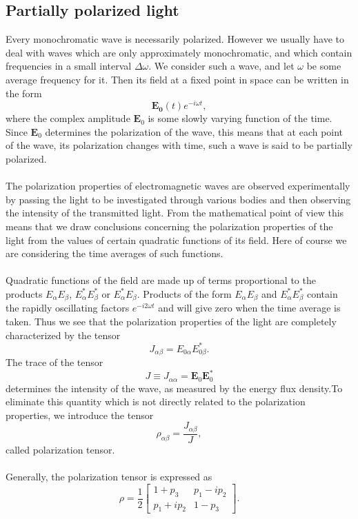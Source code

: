 \subsection{Partially polarized light}
Every monochromatic wave is necessarily polarized. However we usually have to deal with waves which are only approximately monochromatic, and which contain frequencies in a small interval $\Delta \omega$. We consider such a wave, and let $\omega$ be some average frequency for it. Then its field at a fixed point in space can be written in the form
\[\bm{E_0}(t)e^{-i\omega t},\]
where the complex amplitude $\bm{E}_0$ is some slowly varying function of the time. Since $\bm{E}_0$ determines the polarization of the wave, this means that at each point of the wave, its polarization changes with time, such a wave is said to be partially polarized.
\\ \\
The polarization properties of electromagnetic waves are observed experimentally by passing the light to be investigated through various bodies and then
observing the intensity of the transmitted light. From the mathematical point of view this means that we draw conclusions concerning the polarization properties of the light from the values of certain quadratic functions of its field. Here of course we are considering the time averages of such functions.
\\ \\
Quadratic functions of the field are made up of terms proportional to the products $E_{\alpha} E_{\beta}$,
$E_{\alpha}^{*} E^{*}_{\beta}$ or $E_{\alpha}^* E_{\beta}$. Products of the form $E_{\alpha} E_{\beta}$ and
$E_{\alpha}^{*} E^{*}_{\beta}$ contain the rapidly oscillating factors $e^{-i2\omega t}$ and will give zero when the time average is taken. Thus we see that the polarization properties of the light are completely characterized by the tensor
\[J_{\alpha \beta} = E_{0\alpha} E_{0\beta}^{*}.\]
The trace of the tensor
\[J \equiv J_{\alpha\alpha} = \bm{E}_0 \bm{E}^*_0\]
determines the intensity of the wave, as measured by the energy flux density.To eliminate this quantity which is not directly related to the polarization properties, we
introduce the tensor
\[\rho_{\alpha\beta} = \frac{J_{\alpha\beta}}{J},\]
called polarization tensor.
\\ \\
Generally, the polarization tensor is expressed as
\[\rho = \frac{1}{2} \left[ \begin{matrix} 1+p_{3}& p_1-ip_2\\ p_1+ip_2& 1-p_{3}\end{matrix} \right] .\]
